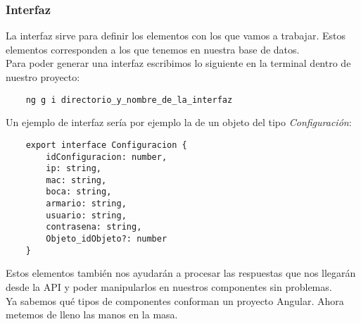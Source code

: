\subsubsection{Interfaz}
La interfaz sirve para definir los elementos con los que vamos a trabajar. Estos elementos corresponden a los que tenemos en nuestra base de datos.
\\Para poder generar una interfaz escribimos lo siguiente en la terminal dentro de nuestro proyecto:
\begin{verbatim}
    ng g i directorio_y_nombre_de_la_interfaz
\end{verbatim}
Un ejemplo de interfaz sería por ejemplo la de un objeto del tipo \textit{Configuración}:
\begin{verbatim}
    export interface Configuracion {
        idConfiguracion: number,
        ip: string,
        mac: string,
        boca: string,
        armario: string,
        usuario: string,
        contrasena: string,
        Objeto_idObjeto?: number
    }
\end{verbatim}
Estos elementos también nos ayudarán a procesar las respuestas que nos llegarán desde la API y poder manipularlos en nuestros componentes sin problemas.
\vspace{\baselineskip}
\\Ya sabemos qué tipos de componentes conforman un proyecto Angular. Ahora metemos de lleno las manos en la masa.